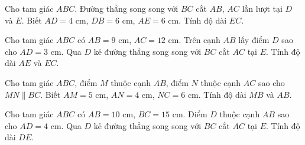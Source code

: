 

\begin{bt}%
	Cho tam giác $ABC$. Đường thẳng song song với $BC$ cắt $AB$, $AC$ lần lượt tại $D$ và $E$. Biết $AD=4\text{ cm}$, $DB=6\text{ cm}$, $AE=6\text{ cm}$. Tính độ dài $EC$.
\end{bt}

\begin{bt}%
	Cho tam giác $ABC$ có $AB=9\text{ cm}$, $AC=12\text{ cm}$. Trên cạnh $AB$ lấy điểm $D$ sao cho $AD=3\text{ cm}$. Qua $D$ kẻ đường thẳng song song với $BC$ cắt $AC$ tại $E$. Tính độ dài $AE$ và $EC$.
\end{bt}

\begin{bt}%
	Cho tam giác $ABC$, điểm $M$ thuộc cạnh $AB$, điểm $N$ thuộc cạnh $AC$ sao cho $MN\parallel BC$. Biết $AM=5\text{ cm}$, $AN=4\text{ cm}$, $NC=6\text{ cm}$. Tính độ dài $MB$ và $AB$.
\end{bt}

\begin{bt}%
	Cho tam giác $ABC$ có $AB=10\text{ cm}$, $BC=15\text{ cm}$. Điểm $D$ thuộc cạnh $AB$ sao cho $AD=4\text{ cm}$. Qua $D$ kẻ đường thẳng song song với $BC$ cắt $AC$ tại $E$. Tính độ dài $DE$.
\end{bt}

